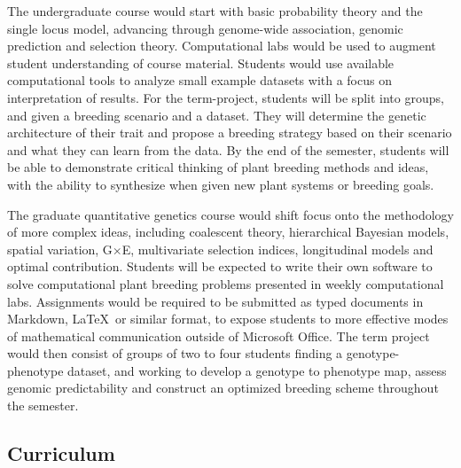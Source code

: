 \documentclass[11pt]{article}
\begin{document}
The undergraduate course would start with basic probability theory and the single locus model, advancing through genome-wide association, genomic prediction and selection theory. Computational labs would be used to augment student understanding of course material. Students would use available computational tools to analyze small example datasets with a focus on interpretation of results. For the term-project, students will be split into groups, and given a breeding scenario and a dataset. They will determine the genetic architecture of their trait and propose a breeding strategy based on their scenario and what they can learn from the data. By the end of the semester, students will be able to demonstrate critical thinking of plant breeding methods and ideas, with the ability to synthesize when given new plant systems or breeding goals. 



The graduate quantitative genetics course would shift focus onto the methodology of more complex ideas, including coalescent theory, hierarchical Bayesian models, spatial variation, G$\times$E, multivariate selection indices, longitudinal models and optimal contribution. Students will be expected to write their own software to solve computational plant breeding problems presented in weekly computational labs. Assignments would be required to be submitted as typed documents in Markdown, \LaTeX\ or similar format, to expose students to more effective modes of mathematical communication outside of Microsoft Office. The term project would then consist of groups of two to four students finding a genotype-phenotype dataset, and working to develop a genotype to phenotype map, assess genomic predictability and construct an optimized breeding scheme throughout the semester. 


\subsection*{Curriculum}
\end{document}
